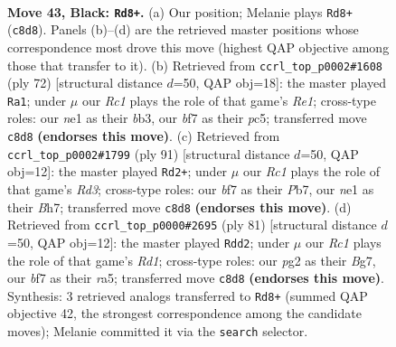 \documentclass[11pt]{article}
\begin{document}
\clearpage

\begin{figure}[p]\centering
\begin{subfigure}{0.46\textwidth}\centering
\resizebox{\linewidth}{!}{%
\newchessgame
\chessboard[
  setfen={2r5/5B2/2k2N2/1b2rp2/1P5R/8/R5P1/3KN3 b - - 2 43},
  showmover=false,
  pgfstyle=straightmove, color=movearrow, markmove={c8-d8}
]}
\caption{}
\end{subfigure}\hfill
\begin{subfigure}{0.46\textwidth}\centering
\resizebox{\linewidth}{!}{%
\newchessgame
\chessboard[
  setfen={1r6/p2nk3/4p3/2p5/4B3/1b4R1/6P1/4R1K1 w - - 4 37},
  showmover=false,
  pgfstyle=straightmove, color=movearrow, markmove={e1-a1}
]}
\caption{}
\end{subfigure}
\\[4pt]
\begin{subfigure}{0.46\textwidth}\centering
\resizebox{\linewidth}{!}{%
\newchessgame
\chessboard[
  setfen={8/1p3R1b/3r3k/2r5/P3p3/4N1RP/7K/8 b - - 0 46},
  showmover=false,
  pgfstyle=straightmove, color=movearrow, markmove={d6-d2}
]}
\caption{}
\end{subfigure}\hfill
\begin{subfigure}{0.46\textwidth}\centering
\resizebox{\linewidth}{!}{%
\newchessgame
\chessboard[
  setfen={3r2k1/6bp/4R3/R4p2/7P/8/P1r1NP2/6K1 b - - 2 41},
  showmover=false,
  pgfstyle=straightmove, color=movearrow, markmove={d8-d2}
]}
\caption{}
\end{subfigure}
\caption{\textbf{Move 43, Black: \texttt{Rd8+}.} (a) Our position; Melanie plays \texttt{Rd8+} (\texttt{c8d8}). Panels (b)--(d) are the retrieved master positions whose correspondence most drove this move (highest QAP objective among those that transfer to it). (b) Retrieved from \texttt{ccrl\_top\_p0002\#1608} (ply 72) [structural distance $d$=50, QAP obj=18]: the master played \texttt{Ra1}; under $\mu$ our \emph{Rc1} plays the role of that game's \emph{Re1}; cross-type roles: our \emph{n}e1 as their \emph{b}b3, our \emph{b}f7 as their \emph{p}c5; transferred move \texttt{c8d8} \textbf{(endorses this move)}. (c) Retrieved from \texttt{ccrl\_top\_p0002\#1799} (ply 91) [structural distance $d$=50, QAP obj=12]: the master played \texttt{Rd2+}; under $\mu$ our \emph{Rc1} plays the role of that game's \emph{Rd3}; cross-type roles: our \emph{b}f7 as their \emph{P}b7, our \emph{n}e1 as their \emph{B}h7; transferred move \texttt{c8d8} \textbf{(endorses this move)}. (d) Retrieved from \texttt{ccrl\_top\_p0000\#2695} (ply 81) [structural distance $d$=50, QAP obj=12]: the master played \texttt{Rdd2}; under $\mu$ our \emph{Rc1} plays the role of that game's \emph{Rd1}; cross-type roles: our \emph{p}g2 as their \emph{B}g7, our \emph{b}f7 as their \emph{r}a5; transferred move \texttt{c8d8} \textbf{(endorses this move)}. Synthesis: 3 retrieved analogs transferred to \texttt{Rd8+} (summed QAP objective 42, the strongest correspondence among the candidate moves); Melanie committed it via the \texttt{search} selector.}
\label{fig:thought-m85}
\end{figure}
\end{document}
